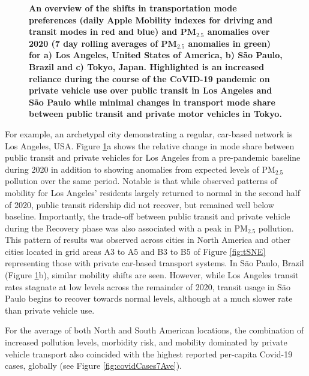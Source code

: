 \documentclass[preprint,12pt]{elsarticle}
\begin{document}
\begin{figure}
         \label{fig:Tokyo}
        \caption{\bf An overview of the shifts in transportation mode preferences (daily Apple Mobility indexes for driving and transit modes in red and blue) and PM$_{2.5}$ anomalies over 2020 (7 day rolling averages of PM$_{2.5}$ anomalies in green) for a) Los Angeles, United States of America, b) S\~ao Paulo, Brazil and c) Tokyo, Japan. Highlighted is an increased reliance during the course of the CoVID-19 pandemic on private vehicle use over public transit in Los Angeles and S\~ao Paulo while minimal changes in transport mode share between public transit and private motor vehicles in Tokyo.}
        \label{fig:three_graphs_Driv_trans}
\end{figure}

For example, an archetypal city demonstrating a regular, car-based network is Los Angeles, USA. Figure \ref{fig:three_graphs_Driv_trans}a shows the relative change in mode share between public transit and private vehicles for Los Angeles from a pre-pandemic baseline during 2020 in addition to showing anomalies from expected levels of PM$_{2.5}$ pollution over the same period. Notable is that while observed patterns of mobility for Los Angeles' residents largely returned to normal in the second half of 2020, public transit ridership did not recover, but remained well below baseline. Importantly, the trade-off between public transit and private vehicle during the Recovery phase was also associated with a peak in PM$_{2.5}$ pollution. This pattern of results was observed across cities in North America and other cities located in grid areas A3 to A5 and B3 to B5 of Figure \ref{fig:tSNE} representing those with private car-based transport systems. In S\~ao Paulo, Brazil (Figure \ref{fig:three_graphs_Driv_trans}b), similar mobility shifts are seen. However, while Los Angeles transit rates stagnate at low levels across the remainder of 2020, transit usage in S\~ao Paulo begins to recover towards normal levels, although at a much slower rate than private vehicle use.

For the average of both North and South American locations, the combination of increased pollution levels, morbidity risk, and mobility dominated by private vehicle transport also coincided with the highest reported per-capita Covid-19 cases, globally (see Figure \ref{fig:covidCases7Ave}). 
\end{document}

